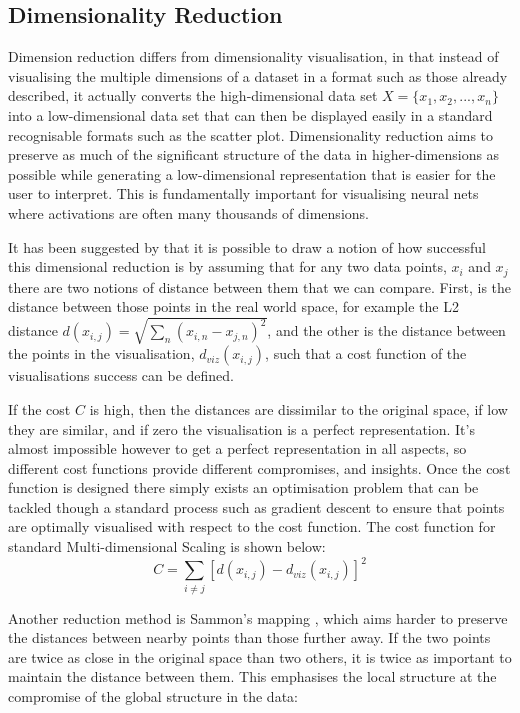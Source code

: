 \documentclass[a4paper,11pt,titlepage]{article}
\begin{document}
\subsection{Dimensionality Reduction}
	Dimension reduction differs from dimensionality visualisation, in that instead of visualising the multiple dimensions of a dataset in a format such as those already described, it actually converts the high-dimensional data set  $ X = \{ x_{1}, x_{2},..., x_{n} \} $ into a low-dimensional data set that can then be displayed easily in a standard recognisable formats such as the scatter plot. Dimensionality reduction aims to preserve as much of the significant structure of the data in higher-dimensions as possible while generating a low-dimensional representation that is easier for the user to interpret. This is fundamentally important for visualising neural nets where activations are often many thousands of dimensions.
		\par 
		It has been suggested by \cite{Olah2014b} that it is possible to draw a notion of how successful this dimensional reduction is by assuming that for any two data points, $ x_{i} $ and $ x_{j} $ there are two notions of distance between them that we can compare. First, is the distance between those points in the real world space, for example the L2 distance $ d(x_{i,j}) = \sqrt{\sum\nolimits_{n} (x_{i,n} - x_{j,n})^2 } $, and the other is the  distance between the points in the visualisation, $ d_{viz}(x_{i,j}) $, such that a cost function of the visualisations success can be defined.
		\par  		
		If the cost $ C $ is high, then the distances are dissimilar to the original space, if low they are similar, and if zero the visualisation is a perfect representation. It's almost impossible however to get a perfect representation in all aspects, so different cost functions provide different compromises, and insights. Once the cost function is designed there simply exists an optimisation problem that can be tackled though a standard process such as gradient descent to ensure that points are optimally visualised with respect to the cost function. The cost function for standard Multi-dimensional Scaling \cite{Torgerson1952} is shown below: 
		$$
			C = 
			\sum\limits_{i \neq j}
			[d(x_{i,j}) - d_{viz}(x_{i,j}) ]^2
		$$
		\par 
		Another reduction method is Sammon's mapping \cite{Sammon1969}, which aims harder to preserve the distances between nearby points than those further away. If the two points are twice as close in the original space than  two others, it is twice as important to maintain the distance between them. This emphasises the local structure at the compromise of the global structure in the data:
\end{document}
